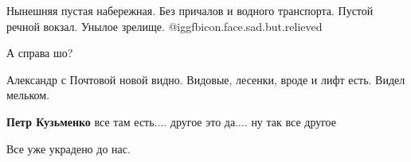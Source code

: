  
 
 
 
 

Нынешняя пустая набережная. Без причалов и водного транспорта. Пустой речной
вокзал. Унылое зрелище. @igg{fbicon.face.sad.but.relieved} 

А справа шо?

Александр с Почтовой новой видно. Видовые, лесенки, вроде и лифт есть. Видел
мельком.

\textbf{Петр Кузьменко} все там есть.... другое это да.... ну так все другое

Все уже украдено до нас.
